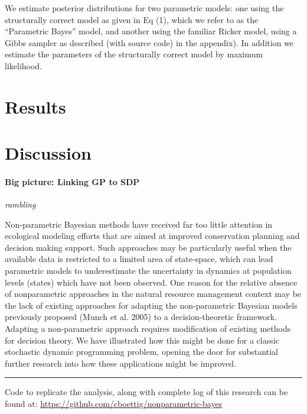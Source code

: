 \documentclass[author-year, review]{elsarticle} %
\begin{document}
We estimate posterior distributions for two parametric models: one using
the structurally correct model as given in Eq (1), which we refer to as
the ``Parametric Bayes'' model, and another using the familiar Ricker
model, using a Gibbs sampler as described (with source code) in the
appendix). In addition we estimate the parameters of the structurally
correct model by maximum likelihood.

\section{Results}\label{results-1}

\section{Discussion}\label{discussion-1}

\paragraph{Big picture: Linking GP to
SDP}\label{big-picture-linking-gp-to-sdp}

\emph{rambling}

Non-parametric Bayesian methods have received far too little attention
in ecological modeling efforts that are aimed at improved conservation
planning and decision making support. Such approaches may be
particularly useful when the available data is restricted to a limited
area of state-space, which can lead parametric models to underestimate
the uncertainty in dynamics at population levels (states) which have not
been observed. One reason for the relative absence of nonparametric
approaches in the natural resource management context may be the lack of
existing approaches for adapting the non-parametric Bayesian models
previously proposed (Munch et al. 2005) to a decision-theoretic
framework. Adapting a non-parametric approach requires modification of
existing methods for decision theory. We have illustrated how this might
be done for a classic stochastic dynamic programming problem, opening
the door for substantial further research into how these applications
might be improved.

\begin{center}\rule{3in}{0.4pt}\end{center}

Code to replicate the analysis, along with complete log of this research
can be found at:
\href{https://github.com/cboettig/nonparametric-bayes/}{https://github.com/cboettig/nonparametric-bayes}
\end{document}
